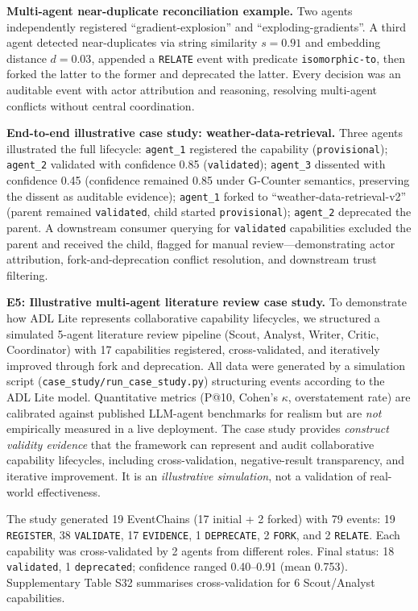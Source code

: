 \textbf{Multi-agent near-duplicate reconciliation example.} Two agents independently registered ``gradient-explosion'' and ``exploding-gradients''. A third agent detected near-duplicates via string similarity $s = 0.91$ and embedding distance $d = 0.03$, appended a \texttt{RELATE} event with predicate \texttt{isomorphic-to}, then forked the latter to the former and deprecated the latter. Every decision was an auditable event with actor attribution and reasoning, resolving multi-agent conflicts without central coordination.

\textbf{End-to-end illustrative case study: weather-data-retrieval.} Three agents illustrated the full lifecycle: \texttt{agent\_1} registered the capability (\texttt{provisional}); \texttt{agent\_2} validated with confidence 0.85 (\texttt{validated}); \texttt{agent\_3} dissented with confidence 0.45 (confidence remained 0.85 under G-Counter semantics, preserving the dissent as auditable evidence); \texttt{agent\_1} forked to ``weather-data-retrieval-v2'' (parent remained \texttt{validated}, child started \texttt{provisional}); \texttt{agent\_2} deprecated the parent. A downstream consumer querying for \texttt{validated} capabilities excluded the parent and received the child, flagged for manual review---demonstrating actor attribution, fork-and-deprecation conflict resolution, and downstream trust filtering.

\textbf{E5: Illustrative multi-agent literature review case study.} To demonstrate how ADL Lite represents collaborative capability lifecycles, we structured a simulated 5-agent literature review pipeline (Scout, Analyst, Writer, Critic, Coordinator) with 17 capabilities registered, cross-validated, and iteratively improved through fork and deprecation. All data were generated by a simulation script (\texttt{case\_study/run\_case\_study.py}) structuring events according to the ADL Lite model. Quantitative metrics (P@10, Cohen's $\kappa$, overstatement rate) are calibrated against published LLM-agent benchmarks for realism but are \emph{not} empirically measured in a live deployment. The case study provides \emph{construct validity evidence} that the framework can represent and audit collaborative capability lifecycles, including cross-validation, negative-result transparency, and iterative improvement. It is an \emph{illustrative simulation}, not a validation of real-world effectiveness.

The study generated 19 EventChains (17 initial + 2 forked) with 79 events: 19 \texttt{REGISTER}, 38 \texttt{VALIDATE}, 17 \texttt{EVIDENCE}, 1 \texttt{DEPRECATE}, 2 \texttt{FORK}, and 2 \texttt{RELATE}. Each capability was cross-validated by 2 agents from different roles. Final status: 18 \texttt{validated}, 1 \texttt{deprecated}; confidence ranged 0.40--0.91 (mean 0.753). Supplementary Table S32 summarises cross-validation for 6 Scout/Analyst capabilities.

